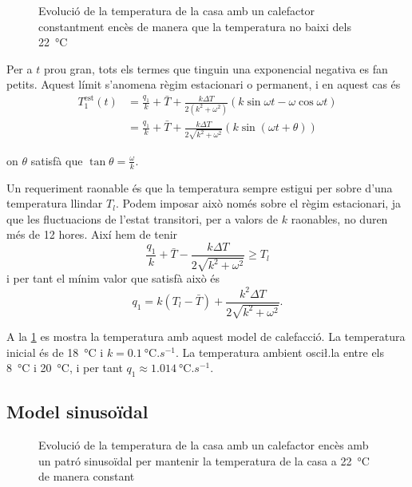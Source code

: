 \documentclass[12pt]{article}
\numberwithin{table}{section}
\numberwithin{figure}{section}
\numberwithin{equation}{section}
\begin{document}
\begin{figure}[htb]
	\small \sffamily \centering
	
	\caption{Evolució de la temperatura de la casa amb un calefactor constantment encès de manera que la temperatura no baixi dels \SI{22}{\celsius}}
	\label{fig:sol 1}
\end{figure}

Per a \( t \) prou gran, tots els termes que tinguin una exponencial negativa es fan petits. Aquest límit s'anomena règim estacionari o permanent, i en aquest cas és
\begin{equation} \label{eq:estacionari 1}
	\begin{aligned}
		T_1^\text{est} (t) & = \frac{q_1}{k} + \bar{T} + \frac{k\Delta T}{2(k^2 + \omega^2)}\left(k \sin{\omega t} - \omega \cos{\omega t}\right) \\
										 	 & = \frac{q_1}{k} + \bar{T} + \frac{k\Delta T}{2\sqrt{k^2 + \omega^2}}\left(k \sin{\left(\omega t + \theta\right)}\right)
	\end{aligned}
\end{equation}

on \( \theta \) satisfà que \( \tan{\theta} = \frac{\omega}{k} \). 

Un requeriment raonable és que la temperatura sempre estigui per sobre d'una temperatura llindar \( T_l \). Podem imposar això només sobre el règim estacionari, ja que les fluctuacions de l'estat transitori, per a valors de \( k \) raonables, no duren més de 12 hores. Així hem de tenir
\begin{equation*}
	\frac{q_1}{k} + \bar{T} - \frac{k\Delta T}{2\sqrt{k^2 + \omega^2}} \geq T_l
\end{equation*}
i per tant el mínim valor que satisfà això és 
\begin{equation*}
	q_1 = k\left(T_l - \bar{T}\right) + \frac{k^2 \Delta T}{2 \sqrt{k^2 + \omega^2}}. 
\end{equation*}

A la \cref{fig:sol 1} es mostra la temperatura amb aquest model de calefacció. La temperatura inicial és de \SI{18}{\celsius} i \( k = \SI{0.1}{\celsius.s^{-1}} \). La temperatura ambient osci\l.la entre els \SI{8}{\celsius} i \SI{20}{\celsius}, i per tant \( q_1 \approx \SI{1.014}{\celsius.s^{-1}} \). 

\subsection{Model sinusoïdal}
\begin{figure}[htb]
	\small \sffamily \centering
	
	\caption{Evolució de la temperatura de la casa amb un calefactor encès amb un patró sinusoïdal per mantenir la temperatura de la casa a \SI{22}{\celsius} de manera constant}
	\label{fig:sol 2}
\end{figure}
\end{document}
